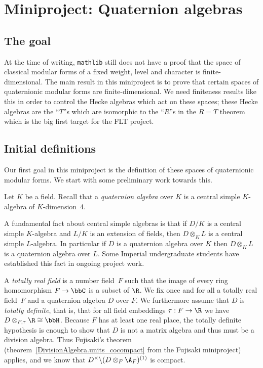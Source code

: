 \chapter{Miniproject: Quaternion algebras}\label{Quat_alg_project}

\section{The goal}

At the time of writing, {\tt mathlib} still does not have a proof that the space
of classical modular forms of a fixed weight, level and character is finite-dimensional.
The main result in this miniproject is to prove that certain spaces of quaternionic modular forms
are finite-dimensional. We need finiteness results
like this in order to control the Hecke algebras which act on these spaces; these Hecke
algebras are the ``$T$''s which are isomorphic to the ``$R$''s in the $R=T$ theorem which
is the big first target for the FLT project.

\section{Initial definitions}

Our first goal in this miniproject is the definition of these spaces of quaternionic modular forms.
We start with some preliminary work towards this.

Let $K$ be a field. Recall that a \emph{quaternion algebra}
over $K$ is a central simple $K$-algebra of $K$-dimension~4.

A fundamental fact about central simple algebras is that if $D/K$
is a central simple $K$-algebra and $L/K$ is an extension of fields, then $D\otimes_KL$
is a central simple $L$-algebra. In particular if $D$ is a quaternion algebra over $K$
then $D\otimes_KL$ is a quaternion algebra over $L$. Some Imperial undergraduate students have established
this fact in ongoing project work.

A \emph{totally real field} is a number field~$F$ such that the image of every ring
homomorphism $F\to\bbC$ is a subset of $\R$. We fix once and for all a totally real field~$F$ and a
quaternion algebra $D$ over $F$. We furthermore assume that $D$ is \emph{totally definite}, that is,
that for all field embeddings $\tau:F\to\R$ we have $D\otimes_{F,\tau}\R\cong\bbH$. Because $F$
has at least one real place, the totally definite hypothesis is enough to show that $D$
is not a matrix algebra and thus must be a division algebra. Thus Fujisaki's theorem (theorem~\ref{DivisionAlgebra.units_cocompact}
from the Fujisaki miniproject) applies, and we know that $D^\times\backslash (D\otimes_F\A_F)^{(1)}$
is compact.

